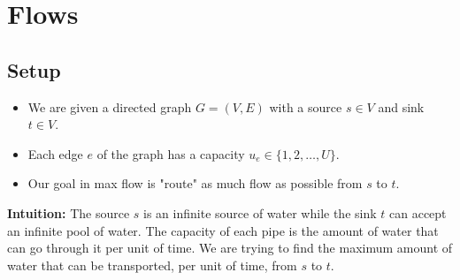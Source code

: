 \documentclass[11pt]{article}
\begin{document}
\section{Flows}

\subsection{Setup}
\begin{itemize}
\item We are given a directed graph $G = (V,E)$ with a source $s \in V$ and sink $t \in V$. 
\item Each edge $e$ of the graph has a capacity $u_e \in \{1,2, \ldots, U\}$. 
\item Our goal in max flow is "route" as much flow as possible from $s$ to $t$. 
\end{itemize}
\textbf{Intuition: }The source $s$ is an infinite source of water while the sink $t$ can accept an infinite pool of water. The capacity of each pipe is the amount of water that can go through it per unit of time. We are trying to find the maximum amount of water that can be transported, per unit of time, from $s$ to $t$. 
\end{document}
